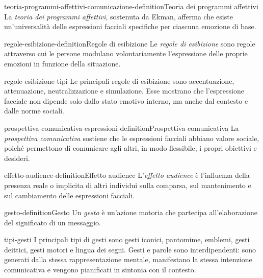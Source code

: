 \documentclass[preview]{standalone}
\begin{document}
\begin{snippetdefinition}{teoria-programmi-affettivi-comunicazione-definition}{Teoria dei programmi affettivi}
    La \emph{teoria dei programmi affettivi}, sostenuta da Ekman, afferma che
    esiste un'universalità delle espressioni facciali specifiche per ciascuna
    emozione di base.
\end{snippetdefinition}

\begin{snippetdefinition}{regole-esibizione-definition}{Regole di esibizione}
    Le \emph{regole di esibizione} sono regole attraverso cui le persone
    modulano volontariamente l'espressione delle proprie emozioni in funzione
    della situazione.
\end{snippetdefinition}

\begin{snippet}{regole-esibizione-tipi}
    Le principali regole di esibizione sono accentuazione, attenuazione,
    neutralizzazione e simulazione. Esse mostrano che l'espressione facciale non
    dipende solo dallo stato emotivo interno, ma anche dal contesto e dalle
    norme sociali.
\end{snippet}

\begin{snippetdefinition}{prospettiva-comunicativa-espressioni-definition}{Prospettiva comunicativa}
    La \emph{prospettiva comunicativa} sostiene che le espressioni facciali
    abbiano valore sociale, poiché permettono di comunicare agli altri, in modo
    flessibile, i propri obiettivi e desideri.
\end{snippetdefinition}

\begin{snippetdefinition}{effetto-audience-definition}{Effetto audience}
    L'\emph{effetto audience} è l'influenza della presenza reale o implicita di
    altri individui sulla comparsa, sul mantenimento e sul cambiamento delle
    espressioni facciali.
\end{snippetdefinition}

\begin{snippetdefinition}{gesto-definition}{Gesto}
    Un \emph{gesto} è un'azione motoria che partecipa all'elaborazione del
    significato di un messaggio.
\end{snippetdefinition}

\begin{snippet}{tipi-gesti}
    I principali tipi di gesti sono gesti iconici, pantomime, emblemi, gesti
    deittici, gesti motori e lingua dei segni. Gesti e parole sono
    interdipendenti: sono generati dalla stessa rappresentazione mentale,
    manifestano la stessa intenzione comunicativa e vengono pianificati in
    sintonia con il contesto.
\end{snippet}
\end{document}
